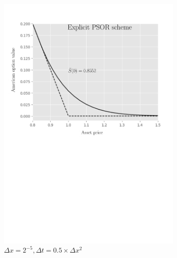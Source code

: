 \begin{figure}[H]
\begin{subfigure}{0.4\textwidth}
    \includegraphics[width=\textwidth]{chapters/chapter5/TestCase2ExplicitLCP.pdf}
    \caption{$\Delta{x}=2^{-5}, \Delta{t}=0.5\times\Delta{x}^2$}
    \label{fig:lcp:numericaresults:test_case_2_explicit}
  \end{subfigure}
  \begin{subfigure}{0.4\textwidth}
    \centering

\end{subfigure}
\end{figure}
